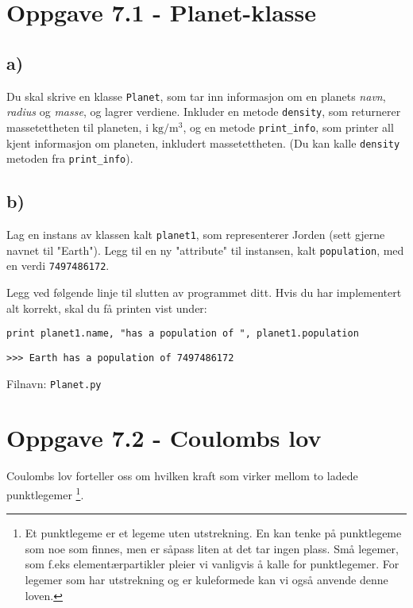 \documentclass[10pt,a4paper]{article}
\begin{document}
 
\section*{Oppgave 7.1 - Planet-klasse}
\subsection*{a)}
Du skal skrive en klasse \texttt{Planet}, som tar inn informasjon om en planets \textit {navn}, \textit{radius} og \textit{masse}, og lagrer verdiene. Inkluder en metode \texttt{density}, som returnerer massetettheten til planeten, i $\mathrm{kg/m^3}$, og en metode \texttt{print\_info}, som printer all kjent informasjon om planeten, inkludert massetettheten. (Du kan kalle \texttt{density} metoden fra \texttt{print\_info}).
 
 
\subsection*{b)}
Lag en instans av klassen kalt \texttt{planet1}, som representerer Jorden (sett gjerne navnet til "Earth"). Legg til en ny "attribute" til instansen, kalt \texttt{population}, med en verdi \texttt{7497486172}.
 
Legg ved følgende linje til slutten av programmet ditt. Hvis du har implementert alt korrekt, skal du få printen vist under:
 
\texttt{print planet1.name, "has a population of ", planet1.population}
 
\begin{verbatim}
>>> Earth has a population of 7497486172
\end{verbatim}
 
 Filnavn: \texttt{Planet.py}
 
\section*{Oppgave 7.2 - Coulombs lov}
Coulombs lov forteller oss om hvilken kraft som virker mellom to ladede punktlegemer
\footnote{Et punktlegeme er et legeme uten utstrekning. En kan tenke på punktlegeme som noe som finnes, men er såpass liten at det tar ingen plass. Små legemer, som f.eks elementærpartikler pleier vi vanligvis å kalle for punktlegemer. 
	For legemer som har utstrekning og er kuleformede kan vi også anvende denne loven.}. \\
 
\end{document}
